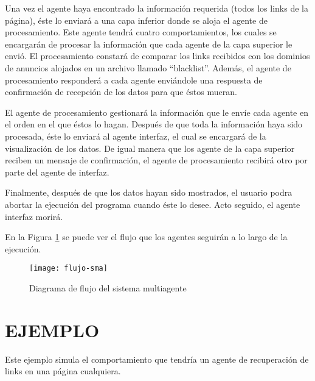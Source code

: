 \documentclass{pre-tfg}
\begin{document}
Una vez el agente haya encontrado la información requerida (todos los links de la página), éste lo enviará a una capa inferior donde se aloja el agente de procesamiento. Este agente tendrá cuatro comportamientos, los cuales se encargarán de procesar la información que cada agente de la capa superior le envió. El procesamiento constará de comparar los links recibidos con los dominios de anuncios alojados en un archivo llamado ``blacklist''. Además, el agente de procesamiento responderá a cada agente enviándole una respuesta de confirmación de recepción de los datos para que éstos mueran.

El agente de procesamiento gestionará la información que le envíe cada agente en el orden en el que éstos lo hagan. Después de que toda la información haya sido procesada, éste lo enviará al agente interfaz, el cual se encargará de la visualización de los datos. De igual manera que los agente de la capa superior reciben un mensaje de confirmación, el agente de procesamiento recibirá otro por parte del agente de interfaz. 

Finalmente, después de que los datos hayan sido mostrados, el usuario podra abortar la ejecución del programa cuando éste lo desee. Acto seguido, el agente interfaz morirá.

En la Figura \ref{fig:flujo-sma} se puede ver el flujo que los agentes seguirán a lo largo de la ejecución.

\begin{figure}[h]
    \centering
    \texttt{[image: flujo-sma]}
    \caption{Diagrama de flujo del sistema multiagente}
    \label{fig:flujo-sma}
\end{figure}

\clearpage

\section{EJEMPLO}

Este ejemplo simula el comportamiento que tendría un agente de recuperación de links en una página cualquiera.
\end{document}
